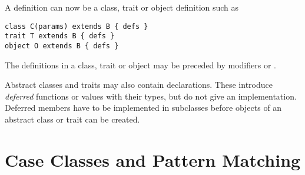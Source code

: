 A definition can now be a class, trait or object definition such as
\begin{lstlisting}
class C(params) extends B { defs }
trait T extends B { defs }
object O extends B { defs }
\end{lstlisting}
The definitions  in a class, trait or object may be
preceded by modifiers  or .

Abstract classes and traits may also contain declarations. These
introduce {\em deferred} functions or values with their types, but do
not give an implementation. Deferred members have to be implemented in
subclasses before objects of an abstract class or trait can be created.

\chapter{Case Classes and Pattern Matching}

